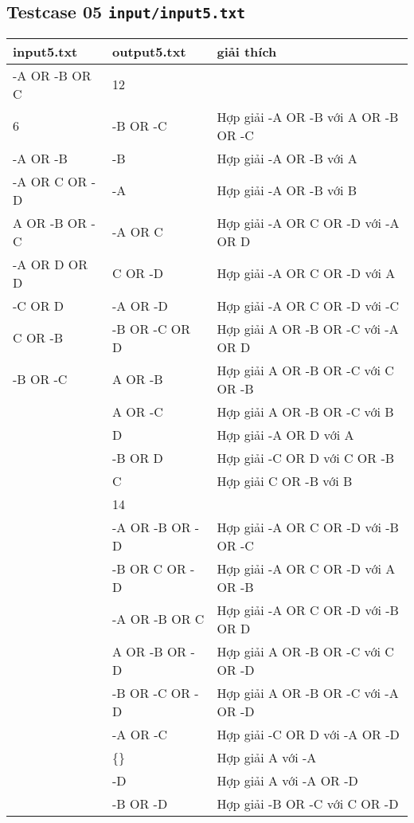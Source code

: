\documentclass[12pt]{article}
\begin{document}
\subsection{Testcase 05 \texttt{input/input5.txt}}
\begin{table}[H]
    \centering
    \begin{tabular}{|l|l|l|}
        \hline
        input5.txt & output5.txt & giải thích  \\
        \hline
        -A OR -B OR C & 12 & \\
        6 & -B OR -C & Hợp giải -A OR -B với A OR -B OR -C \\
        -A OR -B & -B & Hợp giải -A OR -B với A \\
        -A OR C OR -D & -A & Hợp giải -A OR -B với B \\
        A OR -B OR -C & -A OR C & Hợp giải -A OR C OR -D với -A OR D \\
        -A OR D OR D & C OR -D & Hợp giải -A OR C OR -D với A \\
        -C OR D & -A OR -D & Hợp giải -A OR C OR -D với -C \\
        C OR -B & -B OR -C OR D & Hợp giải A OR -B OR -C với -A OR D \\
        -B OR -C & A OR -B & Hợp giải A OR -B OR -C với C OR -B \\
         & A OR -C & Hợp giải A OR -B OR -C với B \\
         & D & Hợp giải -A OR D với A \\
         & -B OR D & Hợp giải -C OR D với C OR -B \\
         & C & Hợp giải C OR -B với B \\
         & 14 & \\
         & -A OR -B OR -D & Hợp giải -A OR C OR -D với -B OR -C \\
         & -B OR C OR -D & Hợp giải -A OR C OR -D với A OR -B \\
         & -A OR -B OR C & Hợp giải -A OR C OR -D với -B OR D \\
         & A OR -B OR -D & Hợp giải A OR -B OR -C với C OR -D \\
         & -B OR -C OR -D & Hợp giải A OR -B OR -C với -A OR -D \\
         & -A OR -C & Hợp giải -C OR D với -A OR -D \\
         & \{\} & Hợp giải A với -A \\
         & -D & Hợp giải A với -A OR -D \\
         & -B OR -D & Hợp giải -B OR -C với C OR -D \\

\end{tabular}
\end{table}
\end{document}

